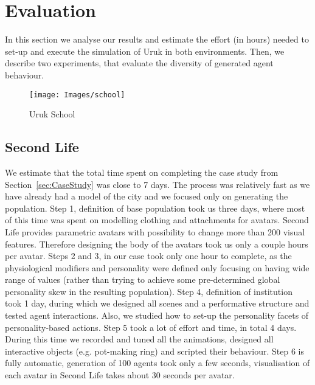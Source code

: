 \section{Evaluation}
\label{sec:evaluation}

In this section we analyse our results and estimate the effort (in hours) needed to set-up and execute the simulation of Uruk in both environments. Then, we describe two experiments, that evaluate the diversity of generated agent behaviour.


\begin{figure}[!ht]
    \centering
    \texttt{[image: Images/school]}
    \label{fig:school}
    \caption{Uruk School}
\end{figure}%

\subsection{Second Life}

We estimate that the total time spent on completing the case study from Section~\ref{sec:CaseStudy} was close to 7 days. The process was relatively fast as we have already had a model of the city and we focused only on generating the population. Step 1, definition of base population took us three days, where most of this time was spent on modelling clothing and attachments for avatars. Second Life provides parametric avatars with possibility to change more than 200 visual features. Therefore designing the body of the avatars took us only a couple hours per avatar. Steps 2 and 3, in our case took only one hour to complete, as the physiological modifiers and personality were defined only focusing on having wide range of values (rather than trying to achieve some pre-determined global personality skew in the resulting population). Step 4, definition of institution took 1 day, during which we designed all scenes and a performative structure and tested agent interactions. Also, we studied how to set-up the personality facets of personality-based actions. Step 5 took a lot of effort and time, in total 4 days. During this time we recorded and tuned all the animations, designed all interactive objects (e.g. pot-making ring) and scripted their behaviour. Step 6 is fully automatic, generation of 100 agents took only a few seconds, visualisation of each avatar in Second Life takes about 30 seconds per avatar. 


